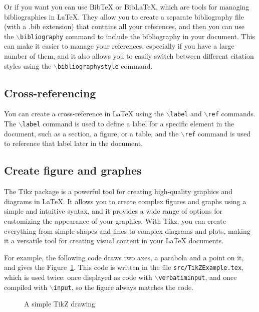 Or if you want you can use BibTeX or BibLaTeX, which are tools for managing bibliographies in LaTeX. They allow you to create a separate bibliography file (with a .bib extension) that contains all your references, and then you can use the \texttt{\(\backslash\)bibliography} command to include the bibliography in your document. This can make it easier to manage your references, especially if you have a large number of them, and it also allows you to easily switch between different citation styles using the \texttt{\(\backslash\)bibliographystyle} command.

\subsection{Cross-referencing}

You can create a cross-reference in LaTeX using the \texttt{\(\backslash\)label} and \texttt{\(\backslash\)ref} commands. The \texttt{\(\backslash\)label} command is used to define a label for a specific element in the document, such as a section, a figure, or a table, and the \texttt{\(\backslash\)ref} command is used to reference that label later in the document.

\subsection{Create figure and graphes}

The Tikz package is a powerful tool for creating high-quality graphics and diagrams in LaTeX. It allows you to create complex figures and graphs using a simple and intuitive syntax, and it provides a wide range of options for customizing the appearance of your graphics. With Tikz, you can create everything from simple shapes and lines to complex diagrams and plots, making it a versatile tool for creating visual content in your LaTeX documents.

For example, the following code draws two axes, a parabola and a point on it, and gives the Figure~\ref{fig:tikz}. This code is written in the file \texttt{src/TikZExample.tex}, which is used twice: once displayed as code with \texttt{\(\backslash\)verbatiminput}, and once compiled with \texttt{\(\backslash\)input}, so the figure always matches the code.
\begin{figure}[h]
  \centering
  \caption{A simple TikZ drawing}
  \label{fig:tikz}
\end{figure}

